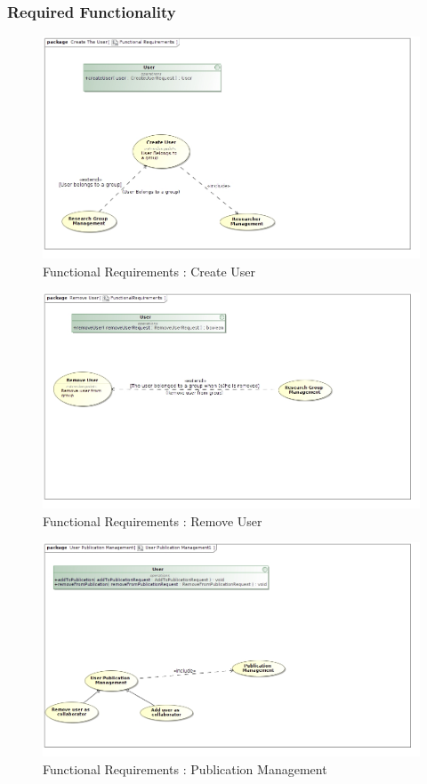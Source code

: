 \documentclass{article}
\begin{document}
	\subsubsection{Required Functionality}
		\begin{figure}[H]
			\includegraphics[scale=0.5]{ReinhardtImages/Functional RequirementsCreateUser.jpg}
			\caption{Functional Requirements : Create User}
	  		\label{Functional Requirements : Create User}
		\end{figure}
		\begin{figure}[H]
			\includegraphics[scale=0.5]{ReinhardtImages/FunctionalRequirementsRemoveUser.jpg}
			\caption{Functional Requirements : Remove User}
	  		\label{Functional Requirements : Remove User}
		\end{figure}
		\begin{figure}[H]
			\includegraphics[scale=0.5]{ReinhardtImages/FunctionalRequirementsPublicationManagement.jpg}
			\caption{Functional Requirements : Publication Management}
	  		\label{Functional Requirements : Publication Management}
		\end{figure}
\end{document}
